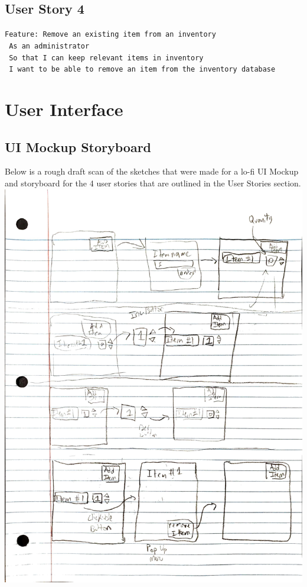 \documentclass{article}
\begin{document}
        \subsection{User Story 4}
            \texttt{Feature: Remove an existing item from an inventory}\\
            \texttt{\phantom{\quad} As an administrator}\\
            \texttt{\phantom{\quad} So that I can keep relevant items in inventory}\\
            \texttt{\phantom{\quad} I want to be able to remove an item from the inventory database}
            
\pagebreak

    \section{User Interface}
        \subsection{UI Mockup Storyboard}
            Below is a rough draft scan of the sketches that were made for a lo-fi UI Mockup and storyboard for the 4 user stories that are outlined in the User Stories section.\\
            \includegraphics[scale=0.18]{resources/storyboard.jpg}
\end{document}
